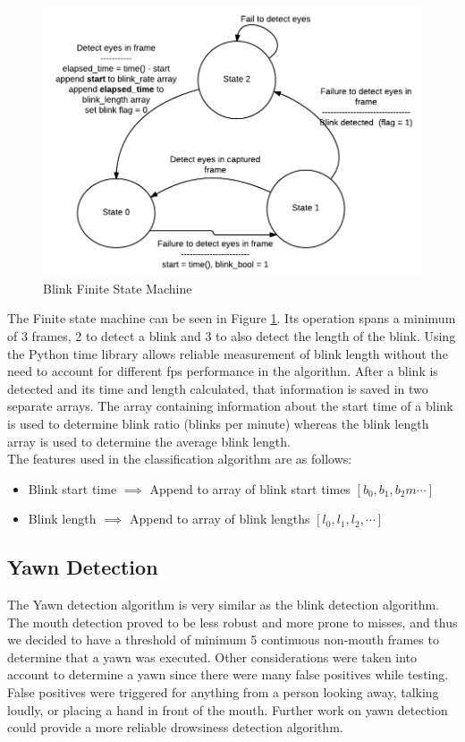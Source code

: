 \documentclass[twocolumn]{article}
\begin{document}
\begin{figure}[H]
\centering
\includegraphics[width=1.1\linewidth]{./state_machine.png}
\caption{Blink Finite State Machine }
\label{fig:blink_fsm}
\end{figure}

The Finite state machine can be seen in Figure \ref{fig:blink_fsm}. Its operation spans a minimum of 3 frames, 2 to detect a blink and 3 to also detect the length of the blink. Using the Python time library allows reliable measurement of blink length without the need to account for different fps performance in the algorithm. After a blink is detected and its time and length calculated, that information is saved in two separate arrays. The array containing information about the start time of a blink is used to determine blink ratio (blinks per minute) whereas the blink length array is used to determine the average blink length. \\
The features used in the classification algorithm are as follows:
\begin{itemize}
\item Blink start time $\implies$ Append to array of blink start times $[b_0, b_1, b_2m\cdots]$
\item Blink length $\implies$ Append to array of blink lengths $[l_0,l_1,l_2,\cdots]$
\end{itemize}



\subsection{Yawn Detection}
The Yawn detection algorithm is very similar as the blink detection algorithm. The mouth detection proved to be less robust and more prone to misses, and thus we decided to have a threshold of minimum 5 continuous non-mouth frames to determine that a yawn was executed. Other considerations were taken into account to determine a yawn since there were many false positives while testing. False positives were triggered for anything from a person looking away, talking loudly, or placing a hand in front of the mouth. Further work on yawn detection could provide a more reliable drowsiness detection algorithm. 
\end{document}
